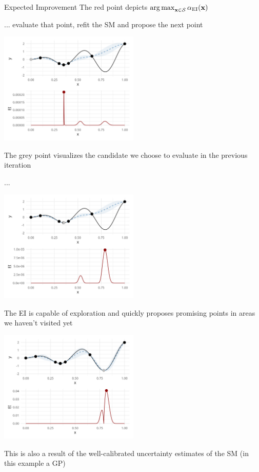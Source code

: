\documentclass[11pt,compress,t,notes=noshow, xcolor=table]{beamer}
\begin{document}
\begin{vbframe}{Expected Improvement}
The red point depicts $\operatorname{arg\,max}_{\mathbf{x} \in \mathcal{S}} \alpha_{\text{EI}}(\mathbf{x})$

\framebreak

... evaluate that point, refit the SM and propose the next point

\begin{center}
  \includegraphics[width = 0.5\textwidth]{figure_man/bayesian_loop_5.png}
\end{center}

The grey point visualizes the candidate we choose to evaluate in the previous iteration

\framebreak

...

\begin{center}
  \includegraphics[width = 0.5\textwidth]{figure_man/bayesian_loop_6.png}
\end{center}

\framebreak

The EI is capable of exploration and quickly proposes promising points in areas we haven't visited yet

\begin{center}
  \includegraphics[width = 0.5\textwidth]{figure_man/bayesian_loop_7.png}
\end{center}

This is also a result of the well-calibrated uncertainty estimates of the SM (in this example a GP)

\end{vbframe}
\end{document}
